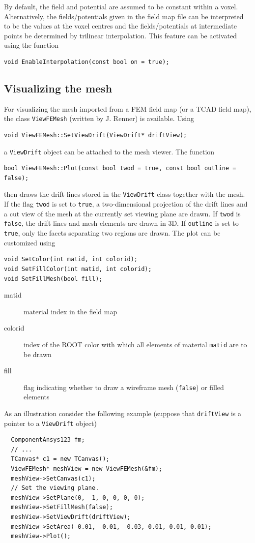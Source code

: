 By default, the field and potential are assumed to be constant within 
a voxel. Alternatively, the fields/potentials given in the field map file
can be interpreted to be the values at the voxel centres and the 
fields/potentials at intermediate points be determined by trilinear interpolation.
This feature can be activated using the function
\begin{lstlisting}
void EnableInterpolation(const bool on = true);
\end{lstlisting} 
 
\subsection{Visualizing the mesh}

For visualizing the mesh imported from a FEM field map (or a TCAD field map), the class 
\texttt{ViewFEMesh} (written by J. Renner) is available. 
Using 
\begin{lstlisting}
void ViewFEMesh::SetViewDrift(ViewDrift* driftView);
\end{lstlisting}
a \texttt{ViewDrift} object can be attached to the mesh viewer. 
The function
\begin{lstlisting}
bool ViewFEMesh::Plot(const bool twod = true, const bool outline = false);
\end{lstlisting}
then draws the drift lines stored in the \texttt{ViewDrift} class together with the mesh.
If the flag \texttt{twod} is set to \texttt{true}, 
a two-dimensional projection of the drift lines and a cut view of the mesh at the currently set viewing plane are drawn. 
If \texttt{twod} is \texttt{false}, the drift lines and mesh elements are drawn in 3D. If \texttt{outline} is set to \texttt{true}, only the 
facets separating two regions are drawn. 
The plot can be customized using 
\begin{lstlisting}
void SetColor(int matid, int colorid);
void SetFillColor(int matid, int colorid);
void SetFillMesh(bool fill);
\end{lstlisting}
\begin{description}
  \item[matid] material index in the field map
  \item[colorid] index of the ROOT color with which all elements of material 
                 \texttt{matid} are to be drawn 
  \item[fill] flag indicating whether to draw a wireframe mesh (\texttt{false}) 
              or filled elements
\end{description}
As an illustration consider the following example 
(suppose that \texttt{driftView} is a pointer to a \texttt{ViewDrift} object) 
\begin{lstlisting}
  ComponentAnsys123 fm;
  // ...
  TCanvas* c1 = new TCanvas();
  ViewFEMesh* meshView = new ViewFEMesh(&fm);
  meshView->SetCanvas(c1);
  // Set the viewing plane.
  meshView->SetPlane(0, -1, 0, 0, 0, 0);
  meshView->SetFillMesh(false);
  meshView->SetViewDrift(driftView);
  meshView->SetArea(-0.01, -0.01, -0.03, 0.01, 0.01, 0.01);
  meshView->Plot();
\end{lstlisting}

